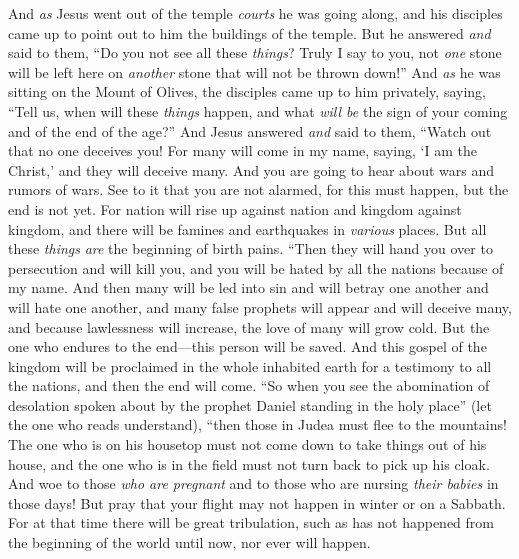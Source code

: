 \begin{biblechapter} %
 And \textit{as} Jesus went out of the temple \textit{courts} he was going along, and his disciples came up to point out to him the buildings of the temple.
\verse But he answered \textit{and} said to them, “Do you not see all these \textit{things}? Truly I say to you, not \textit{one} stone will be left here on \textit{another} stone that will not be thrown down!”
 And \textit{as} he was sitting on the Mount of Olives, the disciples came up to him privately, saying, “Tell us, when will these \textit{things} happen, and what \textit{will be} the sign of your coming and of the end of the age?”
\verse And Jesus answered \textit{and} said to them, “Watch out that no one deceives you!
\verse For many will come in my name, saying, ‘I am the Christ,’ and they will deceive many.
\verse And you are going to hear about wars and rumors of wars. See to it that you are not alarmed, for this must happen, but the end is not yet.
\verse For nation will rise up against nation and kingdom against kingdom, and there will be famines and earthquakes in \textit{various} places.
\verse But all these \textit{things} \textit{are} the beginning of birth pains.
 “Then they will hand you over to persecution and will kill you, and you will be hated by all the nations because of my name.
\verse And then many will be led into sin and will betray one another and will hate one another,
\verse and many false prophets will appear and will deceive many,
\verse and because lawlessness will increase, the love of many will grow cold.
\verse But the one who endures to the end—this person will be saved.
\verse And this gospel of the kingdom will be proclaimed in the whole inhabited earth for a testimony to all the nations, and then the end will come.
 “So when you see the abomination of desolation spoken about by the prophet Daniel standing in the holy place” (let the one who reads understand),
\verse “then those in Judea must flee to the mountains!
\verse The one who is on his housetop must not come down to take things out of his house,
\verse and the one who is in the field must not turn back to pick up his cloak.
\verse And woe to those \textit{who are pregnant} and to those who are nursing \textit{their babies} in those days!
\verse But pray that your flight may not happen in winter or on a Sabbath.
\verse For at that time there will be great tribulation, such as has not happened from the beginning of the world until now, nor ever will happen.

\end{biblechapter}
